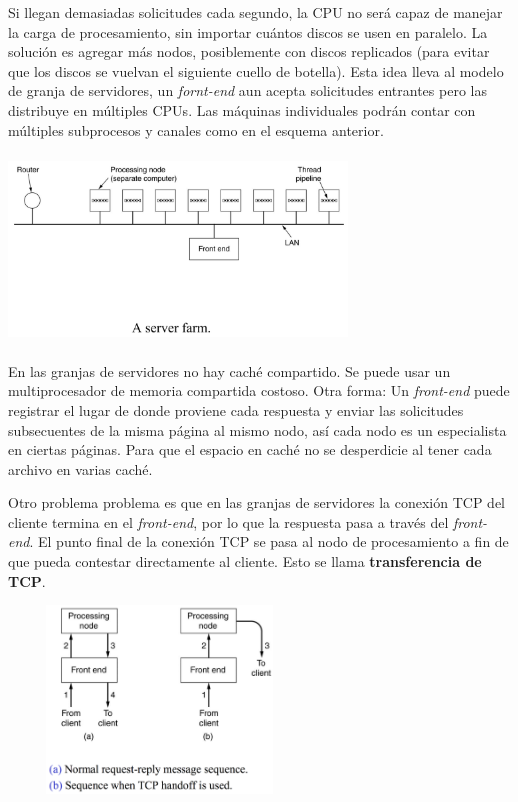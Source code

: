 \documentclass[10pt,a4paper]{report}
\begin{document}
				\par Si llegan demasiadas solicitudes cada segundo, la CPU no será capaz de manejar la carga de procesamiento, sin importar cuántos discos se usen en paralelo. La solución es agregar más nodos, posiblemente con discos replicados (para evitar que los discos se vuelvan el siguiente cuello de botella). Esta idea lleva al modelo de granja de servidores, un \textit{fornt-end} aun acepta solicitudes entrantes pero las distribuye en múltiples CPUs. Las máquinas individuales podrán contar con múltiples subprocesos y canales como en el esquema anterior.

				\begin{center}
					\includegraphics[width=9cm, height=5cm]{./imagenes/farm.png} 
				\end{center}

				\par En las granjas de servidores no hay caché compartido. Se puede usar un multiprocesador de memoria compartida costoso. Otra forma: Un \textit{front-end} puede registrar el lugar de donde proviene cada respuesta y enviar las solicitudes subsecuentes de la misma página al mismo nodo, así cada nodo es un especialista en ciertas páginas. Para que el espacio en caché no se desperdicie al tener cada archivo en varias caché.
				
				\par Otro problema problema es que en las granjas de servidores la conexión TCP del cliente termina en el \textit{front-end}, por lo que la respuesta pasa a través del \textit{front-end}. El punto final de la conexión TCP se pasa al nodo de procesamiento a fin de que pueda contestar directamente al cliente. Esto se llama \textbf{transferencia de TCP}.

				\begin{center}
					\includegraphics[width=8cm, height=5cm]{./imagenes/serverfarm.png} 
				\end{center}
\end{document}
